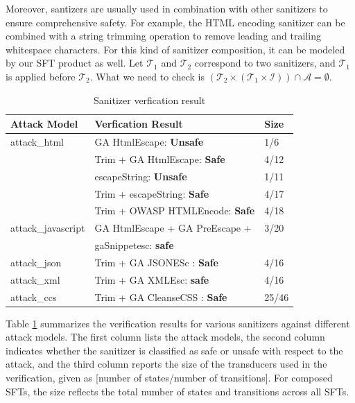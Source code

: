 Moreover, santizers are usually used in combination with other sanitizers to ensure comprehensive safety. For example, the HTML encoding sanitizer can be combined with a string trimming operation to remove leading and trailing whitespace characters. For this kind of sanitizer composition, it can be modeled by our SFT product as well. Let $\mathcal{T}_1$ and $\mathcal{T}_2$ correspond to two sanitizers, and $\mathcal{T}_1$ is applied before $\mathcal{T}_2$. What we need to check is $(\mathcal{T}_2 \times (\mathcal{T}_1 \times \mathcal{I})) \cap \mathcal{A} = \emptyset$.




\begin{table}[h]
  \centering
  \small
  \setlength{\tabcolsep}{4pt} %
  \begin{tabular}{p{2.2cm}ll} %
    \toprule
    \textbf{Attack Model} & \textbf{Verfication Result} & \textbf{Size} \\
    \midrule
    attack\_html           & GA HtmlEscape: \textbf{Unsafe} & 1/6\\
                           & Trim + GA HtmlEscape: \textbf{Safe} & 4/12 \\
                           & escapeString: \textbf{Unsafe} & 1/11 \\
                           & Trim + escapeString: \textbf{Safe} & 4/17 \\
                           & Trim + OWASP HTMLEncode: \textbf{Safe} & 4/18 \\
    \midrule
    attack\_javascript     & GA HtmlEscape + GA PreEscape + & 3/20 \\
                           &  gaSnippetesc: \textbf{safe} & \\
    \midrule
    attack\_json           & Trim + GA JSONESc : \textbf{Safe} & 4/16\\
    \midrule
    attack\_xml            & Trim + GA XMLEsc: \textbf{safe} & 4/16\\
    \midrule
    attack\_ccs            & Trim + GA CleanseCSS : \textbf{Safe} & 25/46\\
    \bottomrule
  \end{tabular}
  \caption{Sanitizer verfication result}
  \label{tab:sanitizer_attack}
\end{table}

Table \ref{tab:sanitizer_attack} summarizes the verification results for various sanitizers against different attack models. The first column lists the attack models, the second column indicates whether the sanitizer is classified as safe or unsafe with respect to the attack, and the third column reports the size of the transducers used in the verification, given as [number of states/number of transitions]. For composed SFTs, the size reflects the total number of states and transitions across all SFTs.

